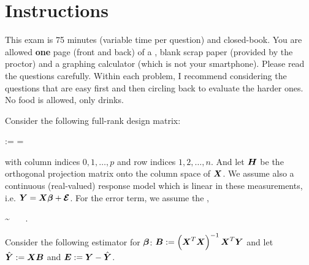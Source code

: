 \documentclass[12pt]{article}
\begin{document}
\section*{Instructions}
This exam is 75 minutes (variable time per question) and closed-book. You are allowed \textbf{one} page (front and back) of a , blank scrap paper (provided by the proctor) and a graphing calculator (which is not your smartphone). Please read the questions carefully. Within each problem, I recommend considering the questions that are easy first and then circling back to evaluate the harder ones. No food is allowed, only drinks. %

\pagebreak

\problem Consider the following full-rank design matrix:

\beqn
\X :=  = 
\eeqn

\noindent with column indices $0, 1, \ldots, p$ and row indices $1, 2, \ldots, n$. And let $\boldsymbol{H}$ be the orthogonal projection matrix onto the column space of $\boldsymbol{X}$. We assume also a continuous (real-valued) response model which is linear in these measurements, i.e. $\boldsymbol{Y} = \boldsymbol{X}\boldsymbol{\beta} + \boldsymbol{\mathcal{E}}$. For the error term, we assume the ,

\beqn
\berrorrv \sim {} ~~~.
\eeqn

\noindent Consider the following estimator for $\boldsymbol{\beta}$: $\boldsymbol{B} := \left(\boldsymbol{X}^T\boldsymbol{X}\right)^{-1}\boldsymbol{X}^T \boldsymbol{Y}$ and let $\hat{\boldsymbol{Y}} := \boldsymbol{X}\boldsymbol{B}$ and $\boldsymbol{E} := \boldsymbol{Y} - \hat{\boldsymbol{Y}}$.
\end{document}
